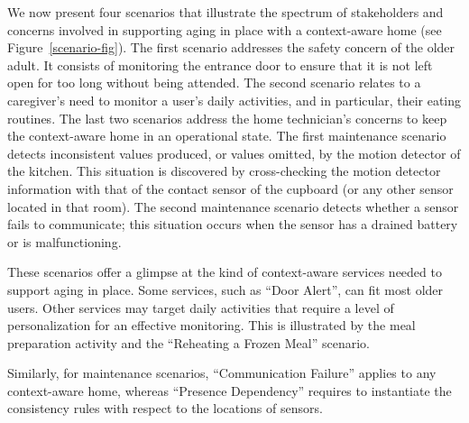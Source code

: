 We now present four scenarios that illustrate the spectrum of stakeholders and concerns involved in supporting aging in place with a context-aware home (see Figure~\ref{scenario-fig}). The first scenario addresses the safety concern of the older adult. It consists of monitoring the entrance door to ensure that it is not left open for too long without being attended. The second scenario relates to a caregiver's need to monitor a user's daily activities, and in particular, their eating routines. The last two scenarios address the home technician's concerns to keep the context-aware home in an operational state. The first maintenance scenario detects inconsistent values produced, or values omitted, by the motion detector of the kitchen. This situation is discovered by cross-checking the motion detector information  with that of the contact sensor of the cupboard (or any other sensor located in that room). The second maintenance scenario detects whether a sensor fails to communicate; this situation occurs when the sensor has a drained battery or is malfunctioning.

These scenarios offer a glimpse at the kind of context-aware services needed to support aging in place. Some services, such as ``Door Alert'', can fit most older users. Other services may target daily activities that require a level of personalization for an effective monitoring. This is illustrated by the meal preparation activity and the ``Reheating a Frozen Meal'' scenario. 

Similarly, for maintenance scenarios, ``Communication Failure'' applies to any context-aware home, whereas ``Presence Dependency'' requires to instantiate the consistency rules with respect to the locations of sensors.


